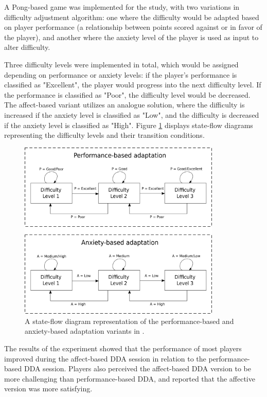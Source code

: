 \documentclass[cic,tc,english]{iiufrgs}
\begin{document}
A Pong-based game was implemented for the study, with two variations in difficulty adjustment algorithm: one where the difficulty would be adapted based on player performance (a relationship between points scored against or in favor of the player), and another where the anxiety level of the player is used as input to alter difficulty.

Three difficulty levels were implemented in total, which would be assigned depending on performance or anxiety levels: if the player's performance is classified as "Excellent", the player would progress into the next difficulty level. If the performance is classified as "Poor", the difficulty level would be decreased. The affect-based variant utilizes an analogue solution, where the difficulty is increased if the anxiety level is classified as "Low", and the difficulty is decreased if the anxiety level is classified as "High". Figure \ref{fig:affective-adaptation} displays state-flow diagrams representing the difficulty levels and their transition conditions.

\begin{figure}[!h]
    \caption{A state-flow diagram representation of the performance-based and anxiety-based adaptation variants in \cite{article_affectivedda}.}
    \begin{center}
        \includegraphics[width=26em]{figures/fig-affective-adaptation.png}
    \end{center}
    \label{fig:affective-adaptation}
\end{figure}

The results of the experiment showed that the performance of most players improved during the affect-based DDA session in relation to the performance-based DDA session. Players also perceived the affect-based DDA version to be more challenging than performance-based DDA, and reported that the affective version was more satisfying.
\end{document}
